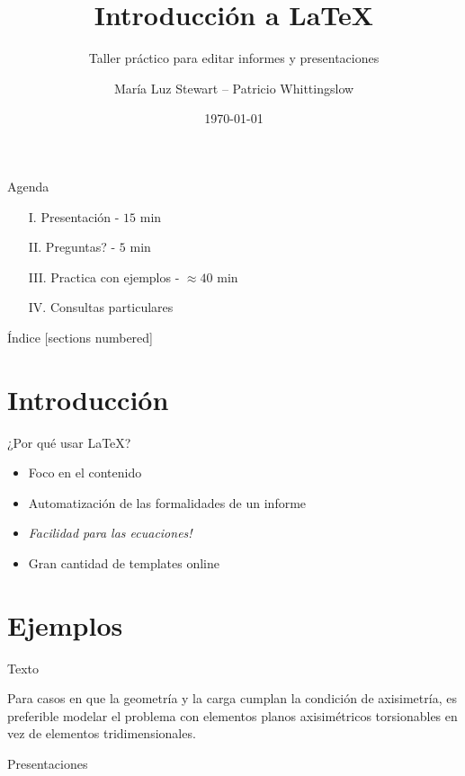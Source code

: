 \documentclass[10pt]{beamer}
\title{Introducción a \textrm{\LaTeX}}
\subtitle{Taller práctico para editar informes y presentaciones}
\date{\today}
\author{María Luz Stewart -- Patricio Whittingslow}
\begin{document}
\maketitle
\begin{frame}{Agenda}
\begin{itemize}
\item[I.] Presentación - $15$ min
\item[II.] Preguntas? - $5$ min
\item[III.] Practica con ejemplos - $\approx40$ min
\item[IV.] Consultas particulares 
\end{itemize}

\end{frame}
\begin{frame}{Índice}
  [sections numbered]
  \tableofcontents[hideallsubsections]
\end{frame}

\section{Introducción}

\begin{frame}[fragile]{¿Por qué usar LaTeX?}
\begin{itemize}
 \setlength\itemsep{1em}
	
\item Foco en el contenido
\item Automatización de las formalidades de un informe
\item \emph{Facilidad para las ecuaciones!}
\item Gran cantidad de templates online

\end{itemize}
\end{frame}

\section{Ejemplos}

\begin{frame}{Texto}


Para casos en que la geometría y la carga cumplan la condición de axisimetría, es preferible modelar el problema con elementos planos axisimétricos torsionables en vez de elementos tridimensionales.

\end{frame}
\begin{frame}{Presentaciones}
\vspace{0.5cm}

\end{frame}
\end{document}
